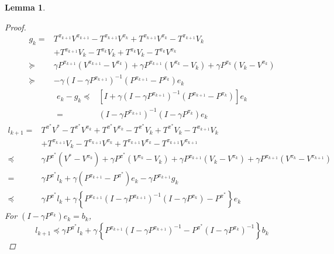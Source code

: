 \documentclass[a4paper]{article}
\newtheorem{lemma}{Lemma}
\begin{document}
\begin{lemma}
    \begin{proof}
        \begin{align*}
            g_k =& T^{\pi_{k+1}} V^{\pi_{k+1}} - T^{\pi_{k+1}} V^{\pi_k} + T^{\pi_{k+1}} V^{\pi_k} - T^{\pi_{k+1}}V_k\\
            & + T^{\pi_{k+1}} V_k - T^{\pi_k} V_k + T^{\pi_k} V_k - T^{\pi_k} V^{\pi_k} \\
            \succeq& \gamma P^{\pi_{k+1}} (V^{\pi_{k+1}} - V^{\pi_k}) + \gamma P^{\pi_{k+1}}(V^{\pi_k} - V_k) + \gamma P^{\pi_k}(V_k - V^{\pi_k}) \\
            \succeq& - \gamma {(I - \gamma P^{\pi_{k+1}})}^{-1} (P^{\pi_{k+1}} - P^{\pi_k})e_k
        \end{align*}
        \begin{align*}
            e_k - g_k \preceq& \left[ I + \gamma {(I - \gamma P^{\pi_{k+1}})}^{-1} (P^{\pi_{k+1}} - P^{\pi_k}) \right] e_k\\
            =& {(I - \gamma P^{\pi_{k+1}})}^{-1} (I - \gamma P^{\pi_k}) e_k
        \end{align*}
        \begin{align*}
            l_{k+1} =& T^{\pi^*} V^* - T^{\pi^*} V^{\pi_k} + T^{\pi^*} V^{\pi_k} - T^{\pi^*} V_k + T^{\pi^*} V_k - T^{\pi_{k+1}}V_k \\
            &+ T^{\pi_{k+1}}V_k - T^{\pi_{k+1}}V^{\pi_k} + T^{\pi_{k+1}}V^{\pi_k} - T^{\pi_{k+1}} V^{\pi_{k+1}} \\
            \preceq& \gamma P^{\pi^*} (V^{*} - V^{\pi_k}) + \gamma P^{\pi^*}(V^{\pi_k} - V_k) + \gamma P^{\pi_{k+1}} (V_k - V^{\pi_k}) + \gamma P^{\pi_{k+1}} (V^{\pi_k} - V^{\pi_{k+1}})\\
            =& \gamma P^{\pi^*} l_k  + \gamma (P^{\pi_{k+1}} - P^{\pi^*}) e_k - \gamma P^{\pi_{k+1}} g_k\\
            \preceq& \gamma P^{\pi^*} l_k + \gamma \left\{ P^{\pi_{k+1}}{( I - \gamma P^{\pi_{k+1}})}^{-1} (I - \gamma P^{\pi_k}) - P^{\pi^*} \right\} e_k
        \end{align*}
        For $ (I - \gamma P^{\pi_k})e_k = b_k $,
        \[
            l_{k+1} \preceq \gamma P^{\pi^*}l_k + \gamma \left\{  P^{\pi_{k+1}}{( I - \gamma P^{\pi_{k+1}})}^{-1}  - P^{\pi^*} {(I - \gamma P^{\pi_k})}^{-1}\right\} b_k
        \]
    \end{proof}
\end{lemma}
\end{document}
